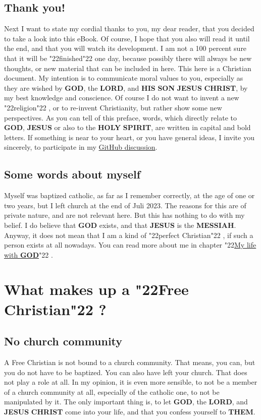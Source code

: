 \documentclass[10pt,a5paper]{article}
\newcommand{\Christ}[0]{\textbf{CHRIST}}
\newcommand{\God}[0]{\textbf{GOD}}
\newcommand{\His}[0]{\textbf{HIS}}
\newcommand{\Holy}[0]{\textbf{HOLY}}
\newcommand{\Jesus}[0]{\textbf{JESUS}}
\newcommand{\Lord}[0]{\textbf{LORD}}
\newcommand{\Messiah}[0]{\textbf{MESSIAH}}
\newcommand{\Son}[0]{\textbf{SON}}
\newcommand{\Spirit}[0]{\textbf{SPIRIT}}
\newcommand{\Them}[0]{\textbf{THEM}}
\newcommand{\q}[1]{\char"22{#1}\char"22 }
\begin{document}
	\subsection{Thank you!}
		Next I want to state my cordial thanks to you,
		my dear reader,
		that you decided to take a look into this eBook.
		Of course,
		I hope that you also will read it until the end,
		and that you will watch its development.
		I am not a 100 percent sure that it will be \q{finished} one day,
		because possibly there will always be new thoughts,
		or new material that can be included in here.
		This here is a Christian document.
		My intention is to communicate moral values to you,
		especially as they are wished by {\God}, the {\Lord},
		and {\His} {\Son} {\Jesus} {\Christ},
		by my best knowledge and conscience.
		Of course I do not want to invent a new \q{religion},
		or to re-invent Christianity,
		but rather show some new perspectives.
		As you can tell of this preface,
		words,
		which directly relate to {\God},
		{\Jesus} or also to the {\Holy} {\Spirit},
		are written in capital and bold letters.
		If something is near to your heart,
		or you have general ideas,
		I invite you sincerely,
		to participate in my  \href{https://github.com/DerRobert-28/Der-Freie-Christ/discussions}{GitHub discussion}.
	
	\subsection{Some words about myself}
		Myself was baptized catholic,
		as far as I remember correctly,
		at the age of one or two years,
		but I left church at the end of Juli 2023.
		The reasons for this are of private nature,
		and are not relevant here.
		But this has nothing to do with my belief.
		I do believe that {\God} exists,
		and that {\Jesus} is the {\Messiah}.
		Anyway,
		it does not mean that I am a kind of \q{perfect Christian},
		if such a person exists at all nowadays.
		You can read more about me in chapter \q{\hyperref[MeinLebenMitGott]{My life with {\God}}}.
	
	\newpage
	\section{What makes up a \q{Free Christian}?}
	
	\subsection{No church community}
		A Free Christian is not bound to a church community.
		That means,
		you can,
		but you do not have to be baptized.
		You can also have left your church.
		That does not play a role at all.
		In my opinion,
		it is even more sensible,
		to not be a member of a church community at all,
		especially of the catholic one,
		to not be manipulated by it.
		The only important thing is,
		to let {\God},
		the {\Lord},
		and {\Jesus} {\Christ} come into your life,
		and that you confess yourself to {\Them}.
	
\end{document}
